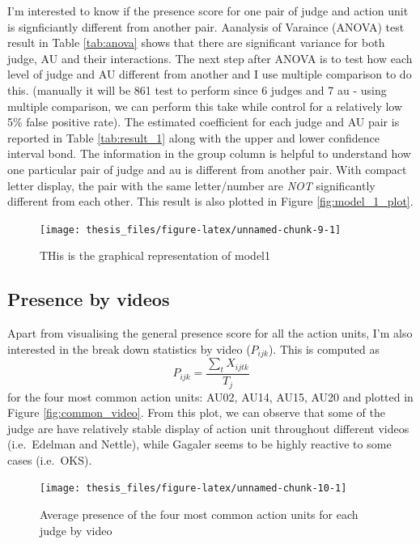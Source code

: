 \documentclass{monashthesis}
\begin{document}
I'm interested to know if the presence score for one pair of judge and action unit is signficiantly different from another pair. Aanalysis of Varaince (ANOVA) test result in Table \ref{tab:anova} shows that there are significant variance for both judge, AU and their interactions. The next step after ANOVA is to test how each level of judge and AU different from another and I use multiple comparison to do this. (manually it will be 861 test to perform since 6 judges and 7 au - using multiple comparison, we can perform this take while control for a relatively low 5\% false positive rate). The estimated coefficient for each judge and AU pair is reported in Table \ref{tab:result_1} along with the upper and lower confidence interval bond. The information in the group column is helpful to understand how one particular pair of judge and au is different from another pair. With compact letter display, the pair with the same letter/number are \emph{NOT} significantly different from each other. This result is also plotted in Figure \ref{fig:model_1_plot}.

\begin{figure}
\texttt{[image: thesis\_files/figure-latex/unnamed-chunk-9-1]} \caption{THis is the graphical representation of model1\label{fig:model_1_plot}}\label{fig:unnamed-chunk-9}
\end{figure}

\hypertarget{presence-by-videos}{%
\subsection{Presence by videos}\label{presence-by-videos}}

Apart from visualising the general presence score for all the action units, I'm also interested in the break down statistics by video (\(P_{ijk}\)). This is computed as \[P_{ijk} = \frac{\sum_{t}X_{ijtk}}{T_j}\] for the four most common action units: AU02, AU14, AU15, AU20 and plotted in Figure \ref{fig:common_video}. From this plot, we can observe that some of the judge are have relatively stable display of action unit throughout different videos (i.e.~Edelman and Nettle), while Gagaler seems to be highly reactive to some cases (i.e.~OKS).

\begin{figure}
\texttt{[image: thesis\_files/figure-latex/unnamed-chunk-10-1]} \caption{Average presence of the four most common action units for each judge by video\label{fig:common_video}}\label{fig:unnamed-chunk-10}
\end{figure}
\end{document}
